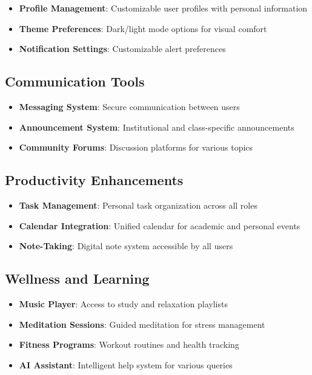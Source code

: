 \begin{itemize}
    \item \textbf{Profile Management}: Customizable user profiles with personal information
    \item \textbf{Theme Preferences}: Dark/light mode options for visual comfort
    \item \textbf{Notification Settings}: Customizable alert preferences
\end{itemize}

\subsection{Communication Tools}

\begin{itemize}
    \item \textbf{Messaging System}: Secure communication between users
    \item \textbf{Announcement System}: Institutional and class-specific announcements
    \item \textbf{Community Forums}: Discussion platforms for various topics
\end{itemize}

\subsection{Productivity Enhancements}

\begin{itemize}
    \item \textbf{Task Management}: Personal task organization across all roles
    \item \textbf{Calendar Integration}: Unified calendar for academic and personal events
    \item \textbf{Note-Taking}: Digital note system accessible by all users
\end{itemize}

\subsection{Wellness and Learning}

\begin{itemize}
    \item \textbf{Music Player}: Access to study and relaxation playlists
    \item \textbf{Meditation Sessions}: Guided meditation for stress management
    \item \textbf{Fitness Programs}: Workout routines and health tracking
    \item \textbf{AI Assistant}: Intelligent help system for various queries
\end{itemize}

